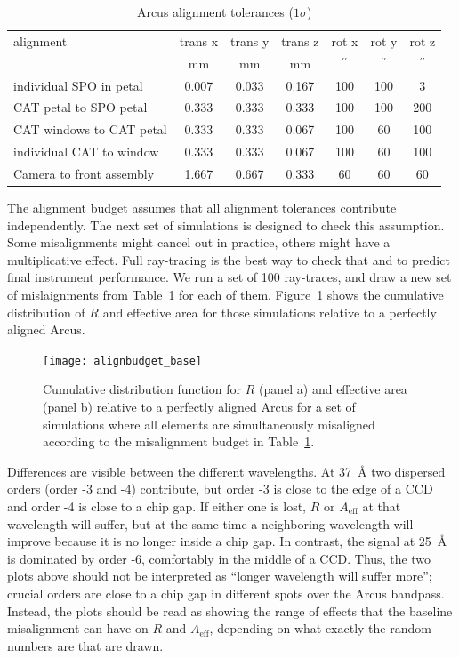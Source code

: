 \documentclass[12pt]{spieman}  %
\begin{document}
\begin{spacing}{1}
\begin{table}
    \caption{Arcus alignment tolerances ($1\sigma$)\label{tab:tolerances}}
    \centering
    \begin{tabular}{l|cccccc}
        \hline\hline
    alignment & trans x & trans y & trans z & rot x & rot y & rot z \\
     & $\mathrm{mm}$ & $\mathrm{mm}$ & $\mathrm{mm}$ & $\mathrm{{}^{\prime\prime}}$ & $\mathrm{{}^{\prime\prime}}$ & $\mathrm{{}^{\prime\prime}}$ \\
     \hline
    individual SPO in petal & 0.007 & 0.033 & 0.167 & 100 & 100 & 3 \\
    CAT petal to SPO petal & 0.333 & 0.333 & 0.333 & 100 & 100 & 200 \\
    CAT windows to CAT petal & 0.333 & 0.333 & 0.067 & 100 & 60 & 100 \\
    individual CAT to window & 0.333 & 0.333 & 0.067 & 100 & 60 & 100 \\
    Camera to front assembly & 1.667 & 0.667 & 0.333 & 60 & 60 & 60 \\
    \end{tabular}
\end{table}

The alignment budget assumes that all alignment tolerances contribute independently. The next set of simulations is designed to check this assumption. Some misalignments might cancel out in practice, others might have a multiplicative effect. Full ray-tracing is the best way to check that and to predict final instrument performance. We run a set of 100 ray-traces, and draw a new set of mislaignments from Table~\ref{tab:tolerances} for each of them. Figure~\ref{fig:alignment_budget} shows the cumulative distribution of $R$ and effective area for those simulations relative to a perfectly aligned Arcus.

\begin{figure}
    \centering
    \texttt{[image: alignbudget\_base]}
    \caption {\label{fig:alignment_budget}
    Cumulative distribution function for $R$ (panel a) and effective area (panel b) relative to a perfectly aligned Arcus for a set of simulations where all elements are simultaneously misaligned according to the misalignment budget in Table~\ref{tab:tolerances}.}
\end{figure}


Differences are visible between the different wavelengths. At 37~\AA{} two dispersed orders (order -3 and -4) contribute, but order -3 is close to the edge of a CCD and order -4 is close to a chip gap. If either one is lost, $R$ or $A_\mathrm{eff}$ at that wavelength will suffer, but at the same time a neighboring wavelength will improve because it is no longer inside a chip gap. In contrast, the signal at 25~\AA{} is dominated by order -6, comfortably in the middle of a CCD. Thus, the two plots above should not be interpreted as ``longer wavelength will suffer more''; crucial orders are close to a chip gap in different spots over the Arcus bandpass. Instead, the plots should be read as showing the range of effects that the baseline misalignment can have on $R$ and $A_\mathrm{eff}$, depending on what exactly the random numbers are that are drawn.


\end{spacing}
\end{document}
